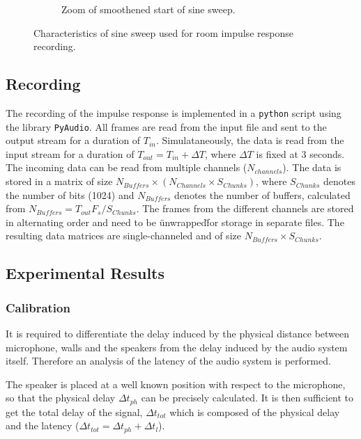 \begin{figure}[htb]
\begin{subfigure}[b]{0.49\linewidth}
        \caption{Zoom of smoothened start of sine sweep.}
        \label{fig:sweep_start}
	\end{subfigure}
	\caption{Characteristics of sine sweep used for room impulse response recording.} 
	\label{fig:sweep}
\end{figure}

\subsection{Recording}

The recording of the impulse response is implemented in a \texttt{python} script using the library \texttt{PyAudio}. 
All frames are read from the input file and sent to the output stream for a duration of $T_{in}$. 
Simulataneously, the data is read from the input stream for a duration of  $T_{out}=T_{in} + \Delta T$, where $\Delta T$ is fixed at 3 seconds. The incoming data can be read from multiple channels ($N_{channels}$). 
The data is stored in a matrix of size $N_{Buffers} \times (N_{Channels} \times  S_{Chunks})$, where $S_{Chunks}$ denotes the number of bits (1024) and $N_{Buffers}$ denotes the number of buffers, calculated from $N_{Buffers} = T_{out}{F_s}/S_{Chunks}$.
The frames from the different channels are stored in alternating order and need to be \"unwrapped\" for storage in separate files. The resulting data matrices are single-channeled and of size $N_{Buffers} \times  S_{Chunks}$.


\subsection{Experimental Results}

\subsubsection{Calibration}
It is required to differentiate the delay induced by the physical distance between microphone, walls and the speakers from the delay induced by the audio system itself. 
Therefore an analysis of the latency of the audio system is performed. 

The speaker is placed at a well known position with respect to the microphone, so that the physical delay $\Delta t_{ph}$ can be precisely calculated. 
It is then sufficient to get the total delay of the signal, $\Delta t_{tot}$ which is composed of the physical delay and the latency ($\Delta t_{tot}=\Delta t_{ph}+\Delta t_{l}$).

